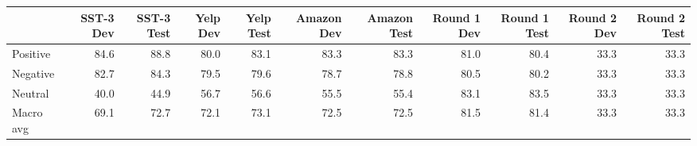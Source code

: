 \begin{tabular}{lrrrrrrrrrr}
\toprule
{} &  SST-3 Dev &  SST-3 Test &  Yelp Dev &  Yelp Test &  Amazon Dev &  Amazon Test &  Round 1 Dev &  Round 1 Test &  Round 2 Dev &  Round 2 Test \\
\midrule
Positive  &       84.6 &        88.8 &      80.0 &       83.1 &        83.3 &         83.3 &         81.0 &          80.4 &         33.3 &          33.3 \\
Negative  &       82.7 &        84.3 &      79.5 &       79.6 &        78.7 &         78.8 &         80.5 &          80.2 &         33.3 &          33.3 \\
Neutral   &       40.0 &        44.9 &      56.7 &       56.6 &        55.5 &         55.4 &         83.1 &          83.5 &         33.3 &          33.3 \\
Macro avg &       69.1 &        72.7 &      72.1 &       73.1 &        72.5 &         72.5 &         81.5 &          81.4 &         33.3 &          33.3 \\
\bottomrule
\end{tabular}
